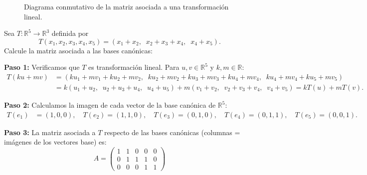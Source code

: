 \begin{figure}[!htbp]\centering
{}
\caption{Diagrama conmutativo de la matriz asociada a una transformación lineal.}\label{fig:diagrama_matriz_asociada}
\end{figure}
\begin{example}\label{ejmntl}
Sea $T: \mathbb{R}^5 \to \mathbb{R}^3$ definida por
\[
T(x_1, x_2, x_3, x_4, x_5) = (x_1 + x_2,\;\; x_2 + x_3 + x_4,\;\; x_4 + x_5).
\] Calcule la matriz asociada a las bases canónicas:
\begin{myproof}
\textbf{Paso 1:} Verificamos que $T$ es transformación lineal. Para $u, v \in \mathbb{R}^5$ y $k, m \in \mathbb{R}$:
\begin{align*}
T(k u + m v) &= (ku_1+mv_1+ku_2+mv_2,\;\; ku_2+mv_2+ku_3+mv_3+ku_4+mv_4,\;\; ku_4+mv_4+ku_5+mv_5) \\
&= k(u_1+u_2,\;\; u_2+u_3+u_4,\;\; u_4+u_5) + m(v_1+v_2,\;\; v_2+v_3+v_4,\;\; v_4+v_5) = kT(u)+mT(v).
\end{align*}

\textbf{Paso 2:} Calculamos la imagen de cada vector de la base canónica de $\mathbb{R}^5$:
\begin{align*}
T(e_1) &= (1,0,0), \quad T(e_2) = (1,1,0), \quad T(e_3) = (0,1,0), \quad T(e_4) = (0,1,1), \quad T(e_5) = (0,0,1).
\end{align*}

\textbf{Paso 3:} La matriz asociada a $T$ respecto de las bases canónicas (columnas = imágenes de los vectores base) es:
\[
\boxed{A = \begin{pmatrix}
1 & 1 & 0 & 0 & 0 \\
0 & 1 & 1 & 1 & 0 \\
0 & 0 & 0 & 1 & 1
\end{pmatrix}}
\]
\end{myproof}
\end{example}

